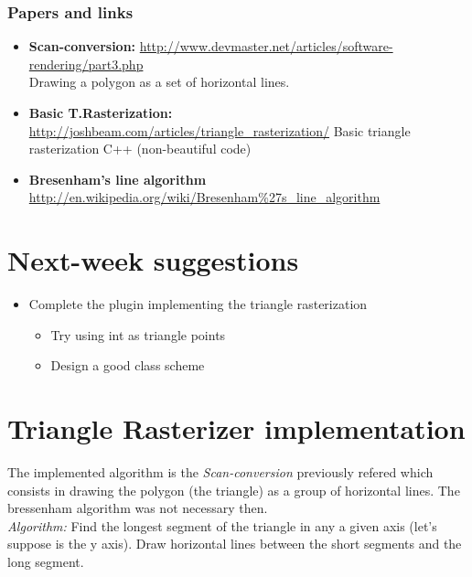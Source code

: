 \documentclass{article}
\begin{document}
\subsubsection*{Papers and links}
\begin{itemize}
\item \textbf{Scan-conversion: }\url{http://www.devmaster.net/articles/software-rendering/part3.php}\\
      Drawing a polygon as a set of horizontal lines.
\item \textbf{Basic T.Rasterization: }\url{http://joshbeam.com/articles/triangle_rasterization/}
  Basic triangle rasterization C++ (non-beautiful code)
\item \textbf{Bresenham's line algorithm} \url{http://en.wikipedia.org/wiki/Bresenham\%27s_line_algorithm}
\end{itemize}


\section{Next-week suggestions}

\begin{itemize}
\item Complete the plugin implementing the triangle rasterization 
  \begin{itemize}
  \item Try using int as triangle points
  \item Design a good class scheme  
  \end{itemize}
\end{itemize}


\section{Triangle Rasterizer implementation}
The implemented algorithm is the \emph{Scan-conversion} previously refered which consists
in drawing the polygon (the triangle) as a group of horizontal lines.
The bressenham algorithm was not necessary then.\\

\emph{Algorithm:}
Find the longest segment of the triangle in any a given axis (let's suppose is the y axis).
Draw horizontal lines between the short segments and the long segment.
\end{document}
